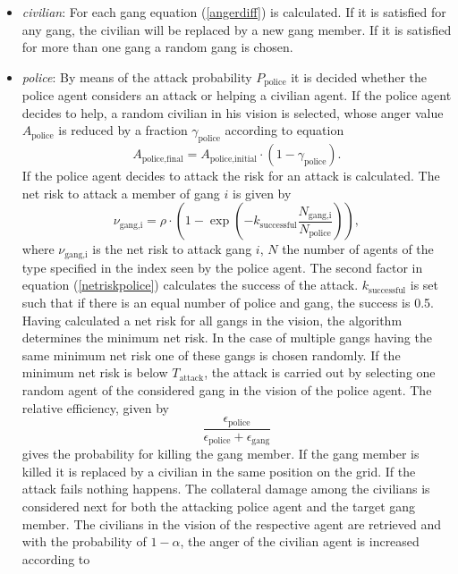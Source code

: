 \documentclass[11pt]{article}
\begin{document}
\begin{itemize}
\item \textit{civilian}: For each gang equation (\ref{angerdiff}) is calculated. If it is satisfied for any gang, the civilian will be replaced by a new gang member. If it is satisfied for more than one gang a random gang is chosen. 
\item \textit{police}: By means of the attack probability $P_{\text{police}}$ it is decided whether the police agent considers an attack or helping a civilian agent. If the police agent decides to help, a random civilian in his vision is selected, whose anger value $A_{\text{police}}$ is reduced by a fraction $\gamma_{\text{police}}$  according to equation
\begin{equation}
A_{\text{police,final}}=A_{\text{police,initial}}\cdot (1-\gamma_{\text{police}}).\label{angeradjust1}
\end{equation}
If the police agent decides to attack the risk for an attack is calculated. The net risk to attack a member of gang $i$ is given by
\begin{equation}
\nu_{\text{gang,i}}=\rho\cdot \left( 1-\exp\left(-k_\text{successful}\frac{N_{\text{gang,i}}}{N_\text{police}}\right)\right),\label{netriskpolice}
\end{equation}
where $\nu_{\text{gang,i}}$ is the net risk to attack gang $i$, $N$ the number of agents of the type specified in the index seen by the police agent. The second factor in equation (\ref{netriskpolice}) calculates the success of the attack. $k_\text{successful}$ is set such that if there is an equal number of police and gang, the success is 0.5. Having calculated a net risk for all gangs in the vision, the algorithm determines the minimum net risk. In the case of multiple gangs having the same minimum net risk one of these gangs is chosen randomly. If the minimum net risk is below $T_{ \text{attack}}$, the attack is carried out by selecting one random agent of the considered gang in the vision of the police agent. The relative efficiency, given by
\begin{equation}
\frac{\epsilon_{\text{police}}}{\epsilon_{\text{police}}+\epsilon_{\text{gang}}}
\end{equation}
gives the probability for killing the gang member. If the gang member is killed it is replaced by a civilian in the same position on the grid. If the attack fails nothing happens. The collateral damage among the civilians is considered next for both the attacking police agent and the target gang member. The civilians in the vision of the respective agent are retrieved and with the probability of $1-\alpha$, the anger of the civilian agent is increased according to 

\end{itemize}
\end{document}
